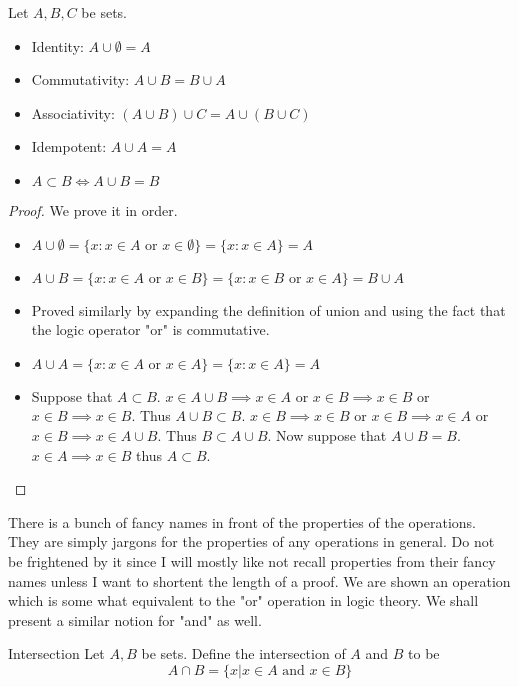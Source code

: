 \begin{prp}{}{} Let $A,B,C$ be sets. 
\begin{itemize}
\item Identity: $A\cup\emptyset=A$
\item Commutativity: $A\cup B=B\cup A$
\item Associativity: $(A\cup B)\cup C=A\cup(B\cup C)$
\item Idempotent: $A\cup A=A$
\item $A\subset B\iff A\cup B=B$
\end{itemize}\tcbline
\begin{proof} We prove it in order. 
\begin{itemize}
\item $A\cup\emptyset=\{x:x\in A\text{ or }x\in\emptyset\}=\{x:x\in A\}=A$
\item $A\cup B=\{x:x\in A\text{ or }x\in B\}=\{x:x\in B\text{ or }x\in A\}=B\cup A$
\item Proved similarly by expanding the definition of union and using the fact that the logic operator "or" is commutative. 
\item $A\cup A=\{x:x\in A\text{ or }x\in A\}=\{x:x\in A\}=A$
\item Suppose that $A\subset B$. $x\in A\cup B\implies x\in A$ or $x\in B\implies x\in B$ or $x\in B\implies x\in B$. Thus $A\cup B\subset B$. $x\in B\implies x\in B$ or $x\in B\implies x\in A$ or $x\in B\implies x\in A\cup B$. Thus $B\subset A\cup B$. Now suppose that $A\cup B=B$. $x\in A\implies x\in B$ thus $A\subset B$. 
\end{itemize}
\end{proof}
\end{prp}

There is a bunch of fancy names in front of the properties of the operations. They are simply jargons for the properties of any operations in general. Do not be frightened by it since I will mostly like not recall properties from their fancy names unless I want to shortent the length of a proof. \linebreak\linebreak
We are shown an operation which is some what equivalent to the "or" operation in logic theory. We shall present a similar notion for "and" as well. 

\begin{defn}{Intersection}{} Let $A,B$ be sets. Define the intersection of $A$ and $B$ to be $$A\cap B=\{x|x\in A\text{ and }x\in B\}$$
\end{defn}


